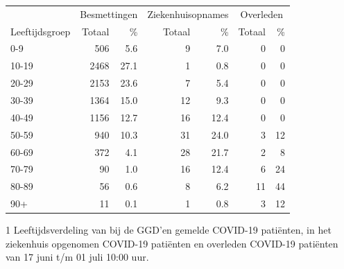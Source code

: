 \documentclass[
  english,
  man,floatsintext]{apa6}
\begin{document}
\begin{table}
\centering\begingroup\fontsize{11}{13}\selectfont

\begin{threeparttable}
\begin{tabular}{lrrrrrr}
\toprule
\multicolumn{1}{c}{ } & \multicolumn{2}{c}{Besmettingen} & \multicolumn{2}{c}{Ziekenhuisopnames} & \multicolumn{2}{c}{Overleden} \\
\cmidrule(l{3pt}r{3pt}){2-3} \cmidrule(l{3pt}r{3pt}){4-5} \cmidrule(l{3pt}r{3pt}){6-7}
Leeftijdsgroep & Totaal & \% & Totaal & \% & Totaal & \%\\
\midrule
0-9 & 506 & 5.6 & 9 & 7.0 & 0 & 0\\
10-19 & 2468 & 27.1 & 1 & 0.8 & 0 & 0\\
20-29 & 2153 & 23.6 & 7 & 5.4 & 0 & 0\\
30-39 & 1364 & 15.0 & 12 & 9.3 & 0 & 0\\
40-49 & 1156 & 12.7 & 16 & 12.4 & 0 & 0\\
50-59 & 940 & 10.3 & 31 & 24.0 & 3 & 12\\
60-69 & 372 & 4.1 & 28 & 21.7 & 2 & 8\\
70-79 & 90 & 1.0 & 16 & 12.4 & 6 & 24\\
80-89 & 56 & 0.6 & 8 & 6.2 & 11 & 44\\
90+ & 11 & 0.1 & 1 & 0.8 & 3 & 12\\
\bottomrule
\end{tabular}
\begin{tablenotes}
\item[1] Leeftijdsverdeling van bij de GGD’en gemelde COVID-19 patiënten, in het ziekenhuis opgenomen COVID-19 patiënten en overleden COVID-19 patiënten van 17 juni t/m 01 juli 10:00 uur.
\end{tablenotes}
\end{threeparttable}
\endgroup{}
\end{table}

\newpage
\end{document}
